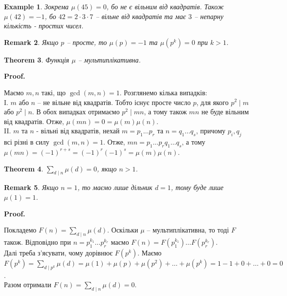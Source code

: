 \documentclass[a4paper, 14pt]{extarticle}
\makeatletter
\theoremstyle{theoremdd}
\newtheorem{theorem}{Theorem}[subsection]
\theoremstyle{theoremdd}
\theoremstyle{theoremdd}
\theoremstyle{theoremdd}
\newtheorem{example}[theorem]{Example}
\theoremstyle{theoremdd}
\theoremstyle{theoremdd}
\newtheorem{remark}[theorem]{Remark}
\theoremstyle{theoremdd}
\theoremstyle{theoremdd}
\def\qed{$\blacksquare$}
\renewenvironment{proof}[1][Proof.\\]{\par
\pushQED{\hfill \qed}%
\normalfont \topsep6\p@\@plus6\p@\relax
\trivlist
\item\relax
{\bfseries
#1\@addpunct{.}}\hspace\labelsep\ignorespaces
}{%
\popQED\endtrivlist\@endpefalse
}
\makeatother
\begin{document}
\begin{example}
Зокрема $\mu(45) = 0$, бо не є вільним від квадратів. Також $\mu(42) = - 1$, бо $42 = 2 \cdot 3 \cdot 7$ -- вільне від квадратів та має $3$ -- непарну кількість - простих чисел.
\end{example}

\begin{remark}
Якщо $p$ -- просте, то $\mu(p) = -1$ та $\mu(p^k) = 0$ при $k > 1$.
\end{remark}

\begin{theorem}
Функція $\mu$ -- мультиплікативна.
\end{theorem}

\begin{proof}
Маємо $m,n$ такі, що $\gcd(m,n) = 1$. Розглянемо кілька випадків:\\
I. $m$ або $n$ -- не вільне від квадратів. Тобто існує просте число $p$, для якого $p^2 \mid m$ або $p^2 \mid n$. В обох випадках отримаємо $p^2 \mid mn$, а тому також $mn$ не буде вільним від квадратів. Отже, $\mu(mn) = 0 = \mu(m)\mu(n)$.\\
II. $m$ та $n$ - вільні від квадратів, нехай $m = p_1 \dots p_r$ та $n = q_1 \dots q_s$, причому $p_i,q_j$ всі різні в силу $\gcd(m,n) = 1$. Отже, $mn = p_1 \dots p_r q_1 \dots q_s$, а тому $\mu(mn) = (-1)^{r+s} = (-1)^r (-1)^s = \mu(m)\mu(n)$.
\end{proof}

\begin{theorem}
$\displaystyle\sum_{d \mid n} \mu(d) = 0$, якщо $n > 1$.
\end{theorem}

\begin{remark}
Якщо $n = 1$, то маємо лише дільник $d = 1$, тому буде лише $\mu(1) = 1$.
\end{remark}

\begin{proof}
Покладемо $F(n) = \displaystyle\sum_{d \mid n} \mu(d)$. Оскільки $\mu$ -- мультиплікативна, то тоді $F$ також. Відповідно при $n = p_1^{k_1} \dots p_r^{k_r}$ маємо $F(n) = F(p_1^{k_1}) \dots F(p_r^{k_r})$.\\
Далі треба з'ясувати, чому дорівнює $F(p^k)$. Маємо\\
$F(p^k) = \displaystyle\sum_{d \mid p^k} \mu(d) = \mu(1) + \mu(p) + \mu(p^2) + \dots + \mu(p^k) = 1 - 1 + 0 + \dots + 0 = 0$.\\
Разом отримали $F(n) = \displaystyle\sum_{d \mid n} \mu(d) = 0$.
\end{proof}
\end{document}
